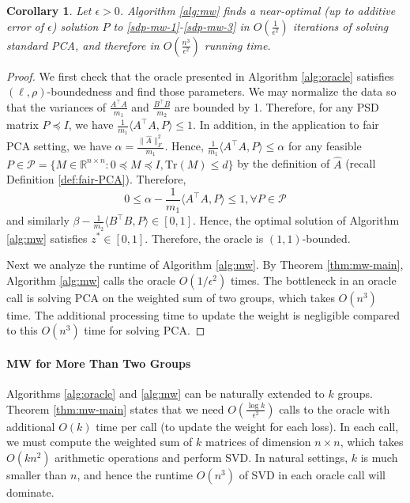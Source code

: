 \documentclass{article}
\newtheorem{corollary}[theorem]{Corollary}
\newcommand{\cP}{\mathcal{P}}
\newcommand{\R}{\mathbb{R}}
\begin{document}
\begin{corollary}
Let \(\epsilon>0\). Algorithm \ref{alg:mw} finds a near-optimal (up to additive error of \(\epsilon\)) solution \(P\) to  \eqref{sdp-mw-1}-\eqref{sdp-mw-3} in \(O\left(\frac{1}{\epsilon^2}\right)\) iterations of solving standard PCA, and therefore in \(O(\frac{n^3}{\epsilon^2})\) running time.
\end{corollary}
\begin{proof}
We first check that the oracle presented in Algorithm \ref{alg:oracle} satisfies \((\ell,\rho)\)-boundedness and find those parameters. We may normalize the data so that the variances of \( \frac{A^\top A}{m_1}\) and \(\frac{B^\top B}{m_2}\) are bounded by 1. Therefore, for any PSD matrix \(P\preceq I\), we have \(\frac{1}{m_1}\langle A^\top A,P\rangle\leq 1\). In addition, in the application to fair PCA setting, we have \(\alpha = \frac{ \|\widehat{A}\|_F^2}{m_1}\). Hence,  \(\frac{1}{m_1}\langle A^\top A,P\rangle\leq \alpha\) for any feasible \(P\in\cP=\{M\in\R^{n\times n}:0\preceq M \preceq I,\text{Tr}(M)\leq d\}\) by the definition of \( \widehat{A}\) (recall Definition \ref{def:fair-PCA}). Therefore,
\begin{equation}
0 \leq \alpha -\frac{1}{m_1}\langle A^\top A,P\rangle \leq 1 ,\forall P\in\cP
\end{equation}
and similarly \( \beta -\frac{1}{m_2}\langle B^\top B,P\rangle \in [0,1]\). Hence, the optimal solution of Algorithm \ref{alg:mw}  satisfies \(z^*\in[0,1]\). Therefore, the oracle is \((1,1)\)-bounded.

Next we analyze the runtime of Algorithm \ref{alg:mw}. By Theorem \ref{thm:mw-main}, Algorithm \ref{alg:mw} calls the oracle \(O(1/\epsilon^2)\) times. The bottleneck in an oracle call is solving PCA on the weighted sum of two groups, which takes \(O(n^3)\) time. The additional processing time to update the weight is negligible compared to this \(O(n^3)\) time for solving PCA.
\end{proof}

\paragraph{MW for More Than Two Groups} Algorithms \ref{alg:oracle} and \ref{alg:mw} can be naturally extended to \(k\) groups. Theorem  \ref{thm:mw-main} states that we need \(O(\frac{\log k}{\epsilon^2})\) calls to the oracle with additional \(O(k)\) time per call (to update the weight for each loss). In each call, we must compute the weighted sum of \(k\) matrices of dimension \(n \times n\), which takes \(O(kn^2)\) arithmetic operations and perform SVD. In natural settings, \(k\) is much smaller than \(n\), and hence the runtime \(O(n^3)\) of SVD in each oracle call will dominate.
\end{document}
